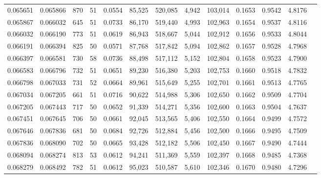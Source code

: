 \begin{tabular}{rrrrrrrrrrrrr}
0.065651 & 0.065866 &   870 &  51 &                                     0.0554 &  85,525 & 520,085 &   4,942 & 103,014 & 0.1653 & 0.9542 & 4.8176 \\
0.065867 & 0.066032 &   645 &  51 &                                     0.0733 &  86,170 & 519,440 &   4,993 & 102,963 & 0.1654 & 0.9537 & 4.8116 \\
0.066032 & 0.066190 &   773 &  51 &                                     0.0619 &  86,943 & 518,667 &   5,044 & 102,912 & 0.1656 & 0.9533 & 4.8044 \\
0.066191 & 0.066394 &   825 &  50 &                                     0.0571 &  87,768 & 517,842 &   5,094 & 102,862 & 0.1657 & 0.9528 & 4.7968 \\
0.066397 & 0.066581 &   730 &  58 &                                     0.0736 &  88,498 & 517,112 &   5,152 & 102,804 & 0.1658 & 0.9523 & 4.7900 \\
0.066583 & 0.066796 &   732 &  51 &                                     0.0651 &  89,230 & 516,380 &   5,203 & 102,753 & 0.1660 & 0.9518 & 4.7832 \\
0.066798 & 0.067033 &   731 &  52 &                                     0.0664 &  89,961 & 515,649 &   5,255 & 102,701 & 0.1661 & 0.9513 & 4.7765 \\
0.067034 & 0.067205 &   661 &  51 &                                     0.0716 &  90,622 & 514,988 &   5,306 & 102,650 & 0.1662 & 0.9509 & 4.7704 \\
0.067205 & 0.067443 &   717 &  50 &                                     0.0652 &  91,339 & 514,271 &   5,356 & 102,600 & 0.1663 & 0.9504 & 4.7637 \\
0.067451 & 0.067645 &   706 &  50 &                                     0.0661 &  92,045 & 513,565 &   5,406 & 102,550 & 0.1664 & 0.9499 & 4.7572 \\
0.067646 & 0.067836 &   681 &  50 &                                     0.0684 &  92,726 & 512,884 &   5,456 & 102,500 & 0.1666 & 0.9495 & 4.7509 \\
0.067836 & 0.068090 &   702 &  50 &                                     0.0665 &  93,428 & 512,182 &   5,506 & 102,450 & 0.1667 & 0.9490 & 4.7444 \\
0.068094 & 0.068274 &   813 &  53 &                                     0.0612 &  94,241 & 511,369 &   5,559 & 102,397 & 0.1668 & 0.9485 & 4.7368 \\
0.068279 & 0.068492 &   782 &  51 &                                     0.0612 &  95,023 & 510,587 &   5,610 & 102,346 & 0.1670 & 0.9480 & 4.7296 \\

\end{tabular}
